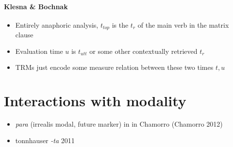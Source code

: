\documentclass[10pt]{article}
\begin{document}
\subsection{Klesna \& Bochnak}
\begin{itemize}
	\item Entirely anaphoric analysis, $t_{top}$ is the $t_r$ of the main verb in the matrix clause
	\item Evaluation time $u$ is $t_{utt}$ or some other contextually retrieved $t_r$
	\item TRMs just encode some measure relation between these two times $ t,u $
\end{itemize}
\part{Interactions with modality}
\begin{itemize}
\item \textit{para} (irrealis modal, future marker) in  in Chamorro (Chamorro 2012)
\item tonnhauser \textit{-ta} 2011 
\end{itemize}
\end{document}
